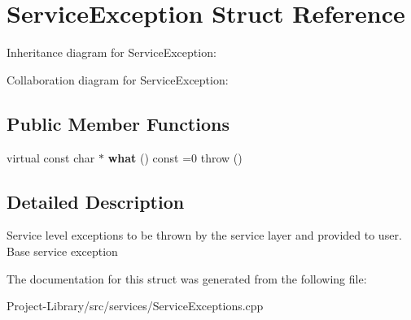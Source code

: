 \hypertarget{structServiceException}{}\section{Service\+Exception Struct Reference}
\label{structServiceException}


Inheritance diagram for Service\+Exception\+:


Collaboration diagram for Service\+Exception\+:
\subsection*{Public Member Functions}
\begin{DoxyCompactItemize}
\item 
\mbox{\label{structServiceException_a7db338e8d28fc1bc284b7700c69ab940}} 
virtual const char $\ast$ {\bfseries what} () const =0  throw ()
\end{DoxyCompactItemize}


\subsection{Detailed Description}
Service level exceptions to be thrown by the service layer and provided to user. Base service exception 

The documentation for this struct was generated from the following file\+:\begin{DoxyCompactItemize}
\item 
Project-\/\+Library/src/services/Service\+Exceptions.\+cpp\end{DoxyCompactItemize}
